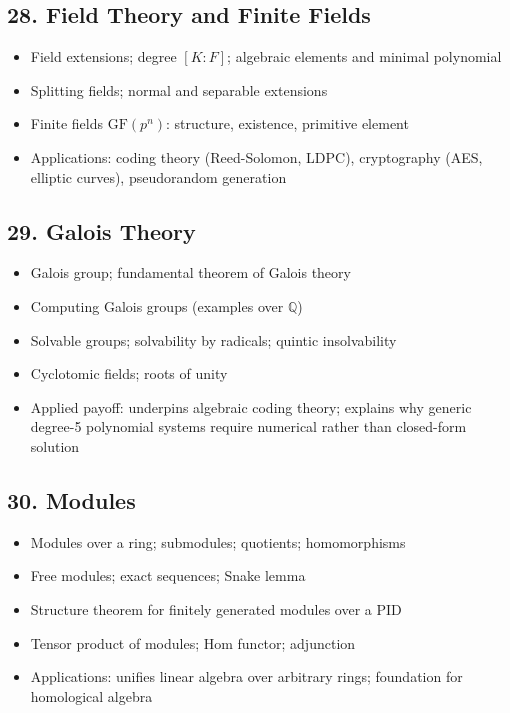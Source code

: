 \subsection{28. Field Theory and Finite Fields}
\begin{itemize}
\item Field extensions; degree $[K:F]$; algebraic elements and minimal polynomial
\item Splitting fields; normal and separable extensions
\item Finite fields $\mathrm{GF}(p^n)$: structure, existence, primitive element
\item Applications: coding theory (Reed-Solomon, LDPC), cryptography (AES, elliptic curves), pseudorandom generation
\end{itemize}

\subsection{29. Galois Theory}
\begin{itemize}
\item Galois group; fundamental theorem of Galois theory
\item Computing Galois groups (examples over $\mathbb{Q}$)
\item Solvable groups; solvability by radicals; quintic insolvability
\item Cyclotomic fields; roots of unity
\item Applied payoff: underpins algebraic coding theory; explains why generic degree-5 polynomial systems require numerical rather than closed-form solution
\end{itemize}

\subsection{30. Modules}
\begin{itemize}
\item Modules over a ring; submodules; quotients; homomorphisms
\item Free modules; exact sequences; Snake lemma
\item Structure theorem for finitely generated modules over a PID
\item Tensor product of modules; Hom functor; adjunction
\item Applications: unifies linear algebra over arbitrary rings; foundation for homological algebra
\end{itemize}

